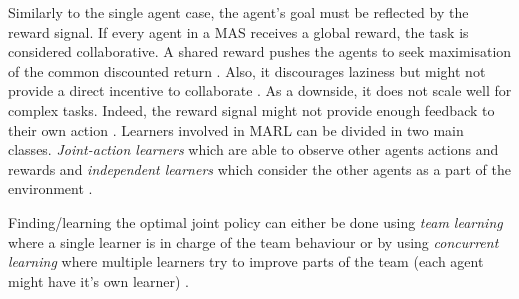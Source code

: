 Similarly to the single agent case, the agent's goal must be reflected by the reward signal. If every agent in a MAS receives a global reward, the task is considered collaborative. A shared reward pushes the agents to seek maximisation of the common discounted return \cite{busoniu_multi-agent_2010}. Also, it discourages laziness but might not provide a direct incentive to collaborate . As a downside, it does not scale well for complex tasks. Indeed, the reward signal might not provide enough feedback to their own action \cite{panait_cooperative_2005}. Learners involved in MARL can be divided in two main classes. \textit{Joint-action learners} which are able to observe other agents actions and rewards and \textit{independent learners} which consider the other agents as a part of the environment \cite{l._leottau_decentralized_2017}. 


 
 

 
Finding/learning the optimal joint policy can either be done using \textit{team learning} where a single learner is in charge of the team behaviour or by using \textit{concurrent learning} where multiple learners try to improve parts of the team (each agent might have it's own learner) \cite{panait_cooperative_2005}.
 
